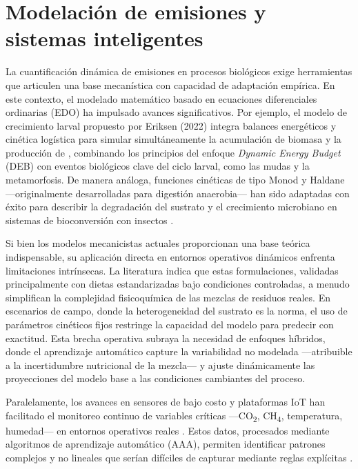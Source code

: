 \section{Modelación de emisiones y sistemas inteligentes}

La cuantificación dinámica de emisiones en procesos biológicos exige herramientas que articulen una base mecanística con capacidad de adaptación empírica. En este contexto, el modelado matemático basado en ecuaciones diferenciales ordinarias (EDO) ha impulsado avances significativos. Por ejemplo, el modelo de crecimiento larval propuesto por Eriksen (2022) integra balances energéticos y cinética logística para simular simultáneamente la acumulación de biomasa y la producción de , combinando los principios del enfoque \textit{Dynamic Energy Budget} (DEB) con eventos biológicos clave del ciclo larval, como las mudas y la metamorfosis. De manera análoga, funciones cinéticas de tipo Monod y Haldane —originalmente desarrolladas para digestión anaerobia— han sido adaptadas con éxito para describir la degradación del sustrato y el crecimiento microbiano en sistemas de bioconversión con insectos \parencite{winAnaerobicDigestionBlack2018, ahlamineMathematicalAnalysisAnaerobic2024}. 

Si bien los modelos mecanicistas actuales proporcionan una base teórica indispensable, su aplicación directa en entornos operativos dinámicos enfrenta limitaciones intrínsecas. La literatura \parencite{bekkerImpactSubstrateMoisture2021a,rossiEstimatingDynamicsGreenhouse2024} indica que estas formulaciones, validadas principalmente con dietas estandarizadas bajo condiciones controladas, a menudo simplifican la complejidad fisicoquímica de las mezclas de residuos reales. En escenarios de campo, donde la heterogeneidad del sustrato es la norma, el uso de parámetros cinéticos fijos restringe la capacidad del modelo para predecir con exactitud. Esta brecha operativa subraya la necesidad de enfoques híbridos, donde el aprendizaje automático capture la variabilidad no modelada —atribuible a la incertidumbre nutricional de la mezcla— y ajuste dinámicamente las proyecciones del modelo base a las condiciones cambiantes del proceso.

Paralelamente, los avances en sensores de bajo costo y plataformas IoT han 
facilitado el monitoreo continuo de variables críticas —CO\textsubscript{2}, 
CH\textsubscript{4}, temperatura, humedad— en entornos operativos reales 
\parencite{rajRealTimeEstimation2023,duobieneDevelopmentWirelessSensor2022,
yavariArtEMonArtificialIntelligence2023}. Estos datos, procesados mediante 
algoritmos de aprendizaje automático (AAA), permiten identificar patrones 
complejos y no lineales que serían difíciles de capturar mediante reglas 
explícitas \parencite{weichertReviewMachineLearning2019,chenOptimizationModelProcess2021}. 

